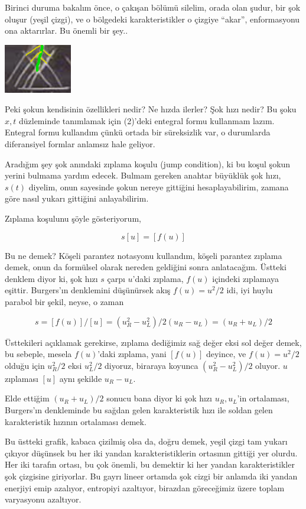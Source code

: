 \documentclass[12pt,fleqn]{article}\usepackage{../../common}
\begin{document}
Birinci duruma bakalım önce, o çakışan bölümü silelim, orada olan şudur, bir şok
oluşur (yeşil çizgi), ve o bölgedeki karakteristikler o çizgiye ``akar'',
enformasyonu ona aktarırlar. Bu önemli bir şey..

\includegraphics[width=8em]{compscieng_2_09_02.png}

Peki şokun kendisinin özellikleri nedir? Ne hızda ilerler? Şok hızı nedir?  Bu
şoku $x,t$ düzleminde tanımlamak için (2)'deki entegral formu kullanmam lazım.
Entegral formu kullandım çünkü ortada bir süreksizlik var, o durumlarda
diferansiyel formlar anlamsız hale geliyor.

Aradığım şey şok anındaki zıplama koşulu (jump condition), ki bu koşul şokun
yerini bulmama yardım edecek. Bulmam gereken anahtar büyüklük şok hızı, $s(t)$
diyelim, onun sayesinde şokun nereye gittiğini hesaplayabilirim, zamana göre
nasıl yukarı gittiğini anlayabilirim.

Zıplama koşulunu şöyle gösteriyorum,

$$
s [u] = [f(u)]
$$

Bu ne demek? Köşeli parantez notasyonu kullandım, köşeli parantez zıplama demek,
onun da formülsel olarak nereden geldiğini sonra anlatacağım. Üstteki denklem
diyor ki, şok hızı $s$ çarpı $u$'daki zıplama, $f(u)$ içindeki zıplamaya
eşittir.  Burgers'ın denklemini düşünürsek akış $f(u) = u^2/2$ idi, iyi huylu
parabol bir şekil, neyse, o zaman

$$
s = [f(u)]/[u] = (u_R^2 - u_L^2) / 2 (u_R-u_L) = (u_R + u_L) / 2
$$

Üsttekileri açıklamak gerekirse, zıplama dediğimiz sağ değer eksi sol değer
demek, bu sebeple, mesela $f(u)$'daki zıplama, yani $[f(u)]$ deyince, ve
$f(u) = u^2/2$ olduğu için $u_R^2/2$ eksi $u_L^2/2$ diyoruz, biraraya koyunca
$(u_R^2 - u_L^2) / 2$ oluyor. $u$ zıplaması $[u]$ aynı şekilde $u_R - u_L$. 

Elde ettiğim $(u_R + u_L) / 2$ sonucu bana diyor ki şok hızı $u_R,u_L$'in
ortalaması, Burgers'ın denkleminde bu sağdan gelen karakteristik hızı
ile soldan gelen karakteristik hızının ortalaması demek.

Bu üstteki grafik, kabaca çizilmiş olsa da, doğru demek, yeşil çizgi tam yukarı
çıkıyor düşünsek bu her iki yandan karakteristiklerin ortasının gittiği yer
olurdu. Her iki tarafın ortası, bu çok önemli, bu demektir ki her yandan
karakteristikler şok çizgisine giriyorlar. Bu gayrı lineer ortamda şok cizgi
bir anlamda iki yandan enerjiyi emip azalıyor, entropiyi azaltıyor, birazdan
göreceğimiz üzere toplam varyasyonu azaltıyor. 
\end{document}

